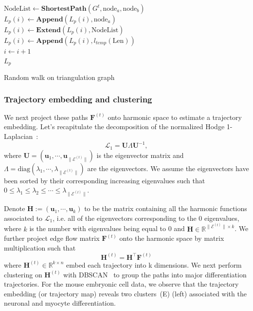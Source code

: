 \begin{algorithm}
{{{                $\text{NodeList} \gets \textbf{ShortestPath}(G^{t}, \text{node}_a, \text{node}_b)$\\
                $L_p(i) \gets \textbf{Append}(L_p(i), \text{node}_a)$\\
                $L_p(i) \gets \textbf{Extend}(L_p(i), \text{NodeList})$\\
            }
        }
        $L_p(i) \gets \textbf{Append}(L_p(i), l_{temp}(\text{Len}))$\\
        $i \gets i+1$\\
    }
    \Return $L_p$
    \caption{Random walk on triangulation graph}
    \label{alg:randomwalk}
\end{algorithm}

\subsubsection{Trajectory embedding and clustering}

We next project these paths $\mathbf{F}^{(t)}$ onto harmonic space to estimate a trajectory embedding. Let's recapitulate the decomposition of the normalized Hodge 1-Laplacian~:
\begin{equation}
\mathcal{L}_1 = \mathbf{U}\Lambda \mathbf{U}^{-1},
\end{equation}
\noindent where $\mathbf{U}=(\mathbf{u}_1,\cdots, \mathbf{u}_{\|\mathcal{E}^{(t)}\|})$ is the eigenvector matrix and $\Lambda = \mathrm{diag}(\lambda_1,\cdots, \lambda_{\|\mathcal{E}^{(t)}\|})$ are the eigenvectors. We assume the eigenvectors have been sorted by their corresponding increasing eigenvalues such that $0\leq\lambda_1\leq\lambda_2\leq\cdots\leq\lambda_{\|\mathcal{E}^{(t)}\|}$.

Denote $\mathbf{H}:=(\mathbf{u}_1,\cdots, \mathbf{u}_{k})$ to be the matrix containing all the harmonic functions associated to $\mathcal{L}_1$, i.e. all of the eigenvectors corresponding to the $0$ eigenvalues, where $k$ is the number with eigenvalues being equal to 0 and $\mathbf{H}\in \mathbb{R}^{\|\mathcal{E}^{(t)}\|\times k}$. We further project edge flow matrix $\mathbf{F}^{(t)}$ onto the harmonic space by matrix multiplication  such that
\begin{equation}
\mathbf{H}^{(t)} = \mathbf{H}^\top \mathbf{F}^{(t)}
\end{equation}
where $\mathbf{H}^{(t)}\in \mathbb{R}^{k\times n}$ embed each trajectory into k dimensions. We next perform clustering on $\mathbf{H}^{(t)}$ with DBSCAN~\citep{ester1996dbscan} to group the paths into major differentiation trajectories. For the mouse embryonic cell data, we observe that the trajectory embedding (or trajectory map) reveals two clusters~(E) (left) associated with the neuronal and myocyte differentiation.


